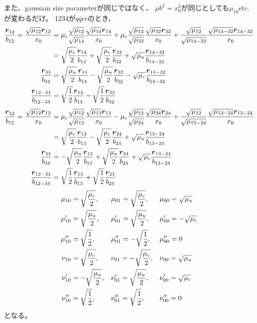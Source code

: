 \documentclass[a4j]{jarticle}
\def\cbar{\overline{{c}}}
\def\qbar{\overline{{q}}}
\newcommand{\xbld}[1]{\mbox{\boldmath $#1$}}
\def\vecr{{\xbld{r}}}
\begin{document}
また、gaussian size parameterが同じではなく、
$\mu b^2=x_0^2$が同じとしても$\mu_{10}$etc.が変わるだけ。
1234が$q\qbar c\cbar$のとき、
\begin{align}
{\vecr_{12}\over b_{12}}={\sqrt{\mu_{12}}\vecr_{12}\over x_0}
&=\mu_c{\sqrt{\mu_{12}}\over \sqrt{\mu_{14}}}{\sqrt{\mu_{14}}\vecr_{14}\over x_0}
+\mu_c{\sqrt{\mu_{12}}\over \sqrt{\mu_{32}}}{\sqrt{\mu_{32}}\vecr_{32}\over  x_0}+{\sqrt{\mu_{12}}\over \sqrt{\mu_{14-32}}}{\sqrt{\mu_{14-32}}\vecr_{14-32}\over  x_0}
\\
&=\sqrt{\mu_c\over 2}{\vecr_{14}\over b_{14}}+\sqrt{\mu_c\over 2}{\vecr_{32}\over b_{32}}+\sqrt{\mu_u}{\vecr_{14-32}\over b_{14-32}}
\\
{\vecr_{34}\over b_{34}}
&=\sqrt{\mu_u\over 2}{\vecr_{14}\over b_{14}}-\sqrt{\mu_u\over 2}{\vecr_{32}\over b_{32}}-\sqrt{\mu_c}{\vecr_{14-32}\over b_{14-32}}
\\
{\vecr_{12-34}\over b_{12-34}}
&=\sqrt{1\over 2}{\vecr_{14}\over b_{14}}-\sqrt{1\over 2}{\vecr_{32}\over b_{32}}
\end{align}
\begin{align}
{\vecr_{12}\over b_{12}}={\sqrt{\mu_{12}}\vecr_{12}\over x_0}
&=\mu_c{\sqrt{\mu_{12}}\over \sqrt{\mu_{13}}}{\sqrt{\mu_{13}}\vecr_{13}\over x_0}
-\mu_c{\sqrt{\mu_{12}}\over \sqrt{\mu_{24}}}{\sqrt{\mu_{24}}\vecr_{24}\over  x_0}+{\sqrt{\mu_{12}}\over \sqrt{\mu_{13-24}}}{\sqrt{\mu_{13-24}}\vecr_{13-24}\over  x_0}
\\
&=\sqrt{\mu_c\over 2}{\vecr_{13}\over b_{13}}-\sqrt{\mu_c\over 2}{\vecr_{24}\over b_{24}}+\sqrt{\mu_u}{\vecr_{13-24}\over b_{13-24}}
\\
{\vecr_{34}\over b_{34}}
&=-\sqrt{\mu_u\over 2}{\vecr_{13}\over b_{13}}+\sqrt{\mu_u\over 2}{\vecr_{24}\over b_{24}}+\sqrt{\mu_c}{\vecr_{13-24}\over b_{13-24}}
\\
{\vecr_{12-34}\over b_{12-34}}
&=\sqrt{1\over 2}{\vecr_{13}\over b_{13}}+\sqrt{1\over 2}{\vecr_{24}\over b_{24}}
\end{align}
\begin{align}
\mu_{10}&=\sqrt{\mu_c\over 2}, && \mu_{01}=\sqrt{\mu_c\over 2}, &&\mu_{00}=\sqrt{\mu_u}
\\
\mu'_{10}&=\sqrt{\mu_u\over 2}, && \mu'_{01}=\sqrt{\mu_u\over 2}, &&\mu'_{00}=-\sqrt{\mu_c}
\\
\mu''_{10}&=\sqrt{1\over 2}, && \mu''_{01}=-\sqrt{1\over 2}, &&\mu''_{00}=0
\\
\nu_{10}&=\sqrt{\mu_c\over 2}, && \nu_{01}=-\sqrt{\mu_c\over 2}, &&\nu_{00}=\sqrt{\mu_u}
\\
\nu'_{10}&=-\sqrt{\mu_u\over 2}, && \nu'_{01}=\sqrt{\mu_u\over 2}, &&\nu'_{00}=\sqrt{\mu_c}
\\
\nu''_{10}&=\sqrt{1\over 2}, && \nu''_{01}=\sqrt{1\over 2}, &&\nu''_{00}=0
\end{align}
となる。
\end{document}
